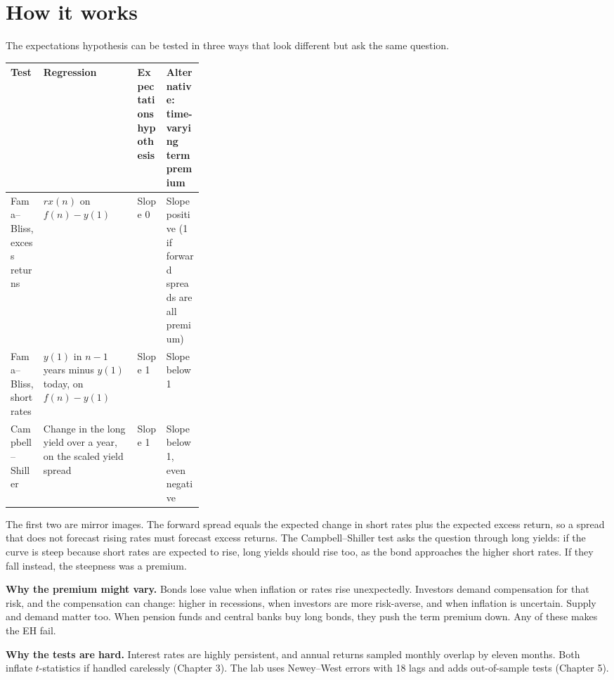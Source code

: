 \section{How it works}
\label{sec:16-how}

The expectations hypothesis can be tested in three ways that look different but ask the same question.

\begin{center}
\small
\begin{tabularx}{0.9\linewidth}{@{}>{\raggedright\arraybackslash}p{0.17\linewidth}>{\raggedright\arraybackslash}X>{\raggedright\arraybackslash}p{0.15\linewidth}>{\raggedright\arraybackslash}X@{}}
\toprule
Test & Regression & Expectations hypothesis & Alternative: time-varying term premium \\
\midrule
Fama--Bliss, excess returns & $rx(n)$ on $f(n) - y(1)$ & Slope 0 & Slope positive (1 if forward spreads are all premium) \\
Fama--Bliss, short rates & $y(1)$ in $n-1$ years minus $y(1)$ today, on $f(n) - y(1)$ & Slope 1 & Slope below 1 \\
Campbell--Shiller & Change in the long yield over a year, on the scaled yield spread & Slope 1 & Slope below 1, even negative \\
\bottomrule
\end{tabularx}
\end{center}

The first two are mirror images. The forward spread equals the expected change in short rates plus the expected excess return, so a spread that does not forecast rising rates must forecast excess returns. The Campbell--Shiller test asks the question through long yields: if the curve is steep because short rates are expected to rise, long yields should rise too, as the bond approaches the higher short rates. If they fall instead, the steepness was a premium.

\textbf{Why the premium might vary.} Bonds lose value when inflation or rates rise unexpectedly. Investors demand compensation for that risk, and the compensation can change: higher in recessions, when investors are more risk-averse, and when inflation is uncertain. Supply and demand matter too. When pension funds and central banks buy long bonds, they push the term premium down. Any of these makes the EH fail.

\textbf{Why the tests are hard.} Interest rates are highly persistent, and annual returns sampled monthly overlap by eleven months. Both inflate $t$-statistics if handled carelessly (Chapter 3). The lab uses Newey--West errors with 18 lags and adds out-of-sample tests (Chapter 5).

